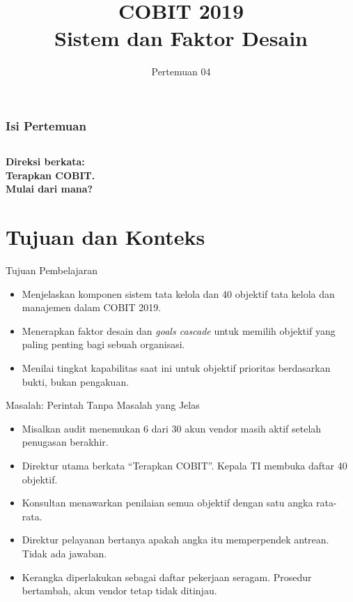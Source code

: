 \documentclass[aspectratio=169, table, 12pt]{beamer}
\title{\Huge COBIT 2019\\ \vspace{10pt} Sistem dan Faktor Desain}
\date{Pertemuan 04}
\begin{document}
\frame{\titlepage}

\begin{frame}
  \frametitle{Isi Pertemuan}
  \vspace{14pt}
  \begin{columns}[t]
    {\small\tableofcontents[sections={1-5}]}

    {\small\tableofcontents[sections={6-9}]}
  \end{columns}
\end{frame}

\begin{frame}{\hfill}
  \centering
  \Huge{\textbf{Direksi berkata:\\Terapkan COBIT.\\Mulai dari mana?}}
\end{frame}

\section{Tujuan dan Konteks}

\begin{frame}{{\Large Tujuan Pembelajaran}}
  \vspace{10pt}
  \begin{itemize}
    \item Menjelaskan komponen sistem tata kelola dan 40 objektif tata kelola dan manajemen dalam
          COBIT 2019.
    \item Menerapkan faktor desain dan \textit{goals cascade} untuk memilih objektif yang paling
          penting bagi sebuah organisasi.
    \item Menilai tingkat kapabilitas saat ini untuk objektif prioritas berdasarkan bukti, bukan
          pengakuan.
  \end{itemize}
\end{frame}

\begin{frame}{{\Large Masalah: Perintah Tanpa Masalah yang Jelas}}
  \vspace{6pt}
  \small
  \begin{itemize}
    \item Misalkan audit menemukan 6 dari 30 akun vendor masih aktif setelah penugasan berakhir.
    \item Direktur utama berkata ``Terapkan COBIT''. Kepala TI membuka daftar 40 objektif.
    \item Konsultan menawarkan penilaian semua objektif dengan satu angka rata-rata.
    \item Direktur pelayanan bertanya apakah angka itu memperpendek antrean. Tidak ada jawaban.
    \item Kerangka diperlakukan sebagai daftar pekerjaan seragam. Prosedur bertambah, akun vendor
          tetap tidak ditinjau.
  \end{itemize}
\end{frame}
\end{document}
